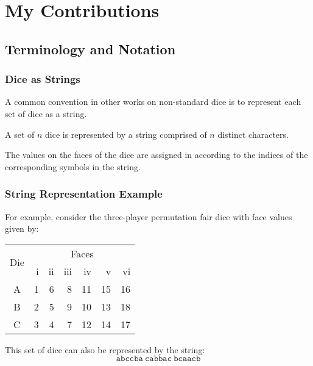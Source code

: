 \documentclass[aspectratio=169]{beamer}
\begin{document}
\section{My Contributions}
\begin{frame}[Triangle=siiorange]
	\tocpage
\end{frame}


\subsection{Terminology and Notation}
\begin{frame}[triangle=siiblue]
\frametitle{Dice as Strings}
A common convention in other works on non-standard dice is to represent each set of dice as a string.

\vfill

A set of $n$ dice is represented by a string comprised of $n$ distinct characters.  

\vfill

The values on the faces of the dice are assigned in according to the indices of the corresponding symbols in the string.
\end{frame}

\begin{frame}[triangle=siiblue]
\frametitle{String Representation Example}
For example, consider the three-player permutation fair dice with face values given by:
{
\footnotesize
\begin{table}
\begin{tabular}{c rrrrrr} \toprule
\multirow{2}[2]{*}{Die} &  \multicolumn{6}{c}{Faces} \\ \cmidrule(lr){2-7}     
   & i & ii & iii & iv & v & vi \\ \midrule
A & 1 & 6 & 8 & 11 & 15 & 16 \\
B & 2 & 5 &  9 & 10 & 13 & 18 \\
C & 3 & 4 & 7 & 12 & 14 & 17 \\ \bottomrule
\end{tabular}
\end{table}
}
\vfill

This set of dice can also be represented by the string:
\begin{equation*}
		\texttt{abccba} \ \texttt{cabbac} \ \texttt{bcaacb}
\end{equation*}
\end{frame}
\end{document}
